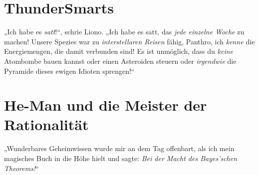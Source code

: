 \section{ThunderSmarts}

„Ich habe es \emph{satt}!“, schrie Liono.
„Ich habe es satt, das \emph{jede einzelne Woche} zu machen! Unsere Spezies war zu \emph{interstellaren Reisen} fähig, Panthro, ich \emph{kenne} die Energiemengen, die damit verbunden sind! Es ist unmöglich, dass du \emph{keine} Atombombe bauen kannst oder einen Asteroiden steuern oder \emph{irgendwie} die Pyramide dieses ewigen Idioten sprengen!“

\section{He-Man und die Meister der Rationalität}

„Wunderbares Geheimwissen wurde mir an dem Tag offenbart, als ich mein magisches Buch in die Höhe hielt und sagte: \emph{Bei der Macht des Bayes’schen Theorems!}“

